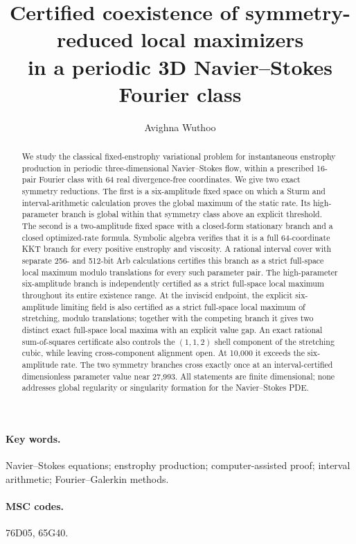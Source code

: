 \documentclass[11pt]{article}
\title{Certified coexistence of symmetry-reduced local maximizers\\
in a periodic 3D Navier--Stokes Fourier class}
\author{Avighna Wuthoo}
\date{}
\begin{document}
\maketitle

\begin{abstract}
We study the classical fixed-enstrophy variational problem for instantaneous
enstrophy production in periodic three-dimensional Navier--Stokes flow, within
a prescribed 16-pair Fourier class with 64 real divergence-free coordinates.
We give two exact symmetry reductions. The first is a six-amplitude fixed
space on which a Sturm and interval-arithmetic calculation proves the global
maximum of the static rate. Its high-parameter branch is global within that
symmetry class above an explicit threshold. The second is a two-amplitude
fixed space with a closed-form stationary branch and a closed optimized-rate
formula. Symbolic algebra verifies that it is a full 64-coordinate KKT branch
for every positive enstrophy and viscosity. A rational interval cover with
separate 256- and 512-bit Arb calculations certifies this branch as a strict
full-space local maximum modulo translations for every such parameter pair.
The high-parameter six-amplitude branch is independently certified as a
strict full-space local maximum throughout its entire existence range.
At the inviscid endpoint, the explicit six-amplitude limiting field is also
certified as a strict full-space local maximum of stretching, modulo
translations; together with the competing branch it gives two distinct exact
full-space local maxima with an explicit value gap.
An exact rational sum-of-squares certificate also controls the $(1,1,2)$
shell component of the stretching cubic, while leaving cross-component
alignment open.
At 10,000 it exceeds the six-amplitude rate. The two symmetry
branches cross exactly once at an interval-certified dimensionless parameter
value near 27,993. All
statements are finite
dimensional; none addresses global regularity or singularity formation for the
Navier--Stokes PDE.
\end{abstract}

\paragraph{Key words.} Navier--Stokes equations; enstrophy production;
computer-assisted proof; interval arithmetic; Fourier--Galerkin methods.
\paragraph{MSC codes.} 76D05, 65G40.
\end{document}
